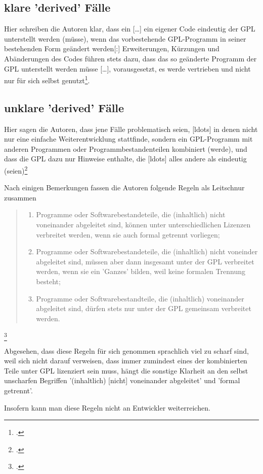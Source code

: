 \documentclass[DIV=calc,BCOR=5mm,11pt,headings=small,oneside,abstract=true, toc=bib]{scrartcl}
\begin{document}
\subsection{klare 'derived' Fälle}

Hier schreiben die Autoren klar, dass ein \glqq{}[\ldots] ein eigener Code
eindeutig der GPL unterstellt werden (müsse), wenn das vorbestehende
GPL-Programm in seiner bestehenden Form geändert werden[:] Erweiterungen,
Kürzungen und Abänderungen des Codes führen stets dazu, dass das so geänderte
Programm der GPL unterstellt werden müsse [\ldots]\grqq{}, vorausgesetzt, es
werde vertrieben und nicht nur für sich selbst
genutzt\footcite[cf.][66]{ifross2005a}.

\subsection{unklare 'derived' Fälle}

Hier sagen die Autoren, dass jene Fälle \glqq{}problematisch\grqq{} seien,
\glqq{}[ldots]  in denen nicht nur eine einfache Weiterentwicklung stattfinde,
sondern ein GPL-Programm mit anderen Programmen oder Programmbestandenteilen
kombiniert (werde)\grqq{}, und dass die GPL dazu nur \glqq{}Hinweise\grqq{}
enthalte, die \glqq{}[ldots] alles andere als eindeutig
(seien)\grqq{}\footcite[cf.][67]{ifross2005a}

Nach einigen Bemerkungen fassen die Autoren folgende Regeln als Leitschnur
zusammen

\begin{quote}
\begin{enumerate}
  \item Programme oder Softwarebestandeteile, die (inhaltlich) nicht voneinander
  abgeleitet sind, können unter unterschiedlichen Lizenzen verbreitet werden,
  wenn sie auch formal getrennt vorliegen;
  \item Programme oder Softwarebestandeteile, die (inhaltlich) nicht voneinder
  abgeleitet sind, müssen aber dann insgesamt unter der GPL verbreitet werden,
  wenn sie ein 'Ganzes' bilden, weil keine formalen Trennung besteht;
  \item Programme oder Softwarebestandteile, die (inhaltlich) voneinander
  abgeleitet sind, dürfen stets nur unter der GPL gemeinsam verbreitet werden.
\end{enumerate}
\end{quote}\footcite[cf.][69]{ifross2005a}

Abgesehen, dass diese Regeln für sich genommen sprachlich viel zu scharf sind,
weil sich nicht darauf verweisen, dass immer zumindest eines der kombinierten
Teile unter GPL lizenziert sein muss, hängt die sonstige Klarheit an den
selbst unscharfen Begriffen '(inhaltlich) [nicht] voneinander abgeleitet' und
'formal getrennt'.

Insofern kann man diese Regeln nicht an Entwickler weiterreichen.

\small

\end{document}
